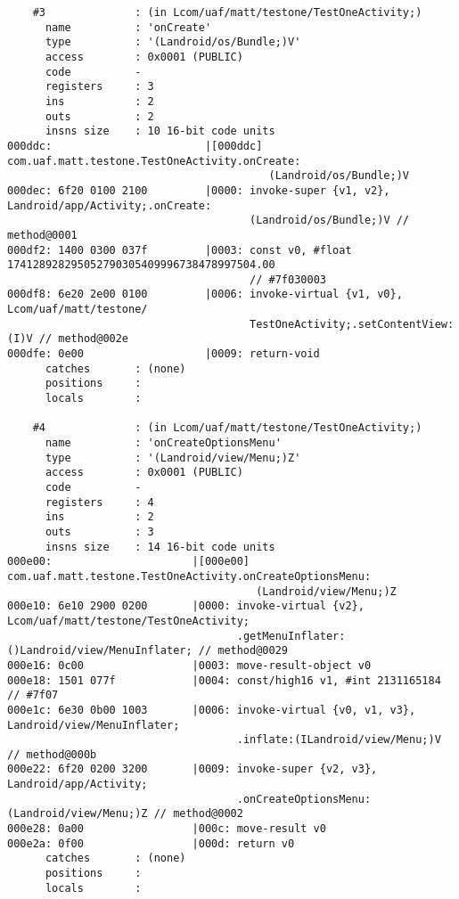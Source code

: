 \begin{lstlisting}
    #3              : (in Lcom/uaf/matt/testone/TestOneActivity;)
      name          : 'onCreate'
      type          : '(Landroid/os/Bundle;)V'
      access        : 0x0001 (PUBLIC)
      code          -
      registers     : 3
      ins           : 2
      outs          : 2
      insns size    : 10 16-bit code units
000ddc:                        |[000ddc] com.uaf.matt.testone.TestOneActivity.onCreate:
                                         (Landroid/os/Bundle;)V
000dec: 6f20 0100 2100         |0000: invoke-super {v1, v2}, Landroid/app/Activity;.onCreate:
                                      (Landroid/os/Bundle;)V // method@0001
000df2: 1400 0300 037f         |0003: const v0, #float 174128928295052790305409996738478997504.00
                                      // #7f030003
000df8: 6e20 2e00 0100         |0006: invoke-virtual {v1, v0}, Lcom/uaf/matt/testone/
                                      TestOneActivity;.setContentView:(I)V // method@002e
000dfe: 0e00                   |0009: return-void
      catches       : (none)
      positions     :
      locals        :

    #4              : (in Lcom/uaf/matt/testone/TestOneActivity;)
      name          : 'onCreateOptionsMenu'
      type          : '(Landroid/view/Menu;)Z'
      access        : 0x0001 (PUBLIC)
      code          -
      registers     : 4
      ins           : 2
      outs          : 3
      insns size    : 14 16-bit code units
000e00:                      |[000e00] com.uaf.matt.testone.TestOneActivity.onCreateOptionsMenu:
                                       (Landroid/view/Menu;)Z
000e10: 6e10 2900 0200       |0000: invoke-virtual {v2}, Lcom/uaf/matt/testone/TestOneActivity;
                                    .getMenuInflater:()Landroid/view/MenuInflater; // method@0029
000e16: 0c00                 |0003: move-result-object v0
000e18: 1501 077f            |0004: const/high16 v1, #int 2131165184 // #7f07
000e1c: 6e30 0b00 1003       |0006: invoke-virtual {v0, v1, v3}, Landroid/view/MenuInflater;
                                    .inflate:(ILandroid/view/Menu;)V // method@000b
000e22: 6f20 0200 3200       |0009: invoke-super {v2, v3}, Landroid/app/Activity;
                                    .onCreateOptionsMenu:(Landroid/view/Menu;)Z // method@0002
000e28: 0a00                 |000c: move-result v0
000e2a: 0f00                 |000d: return v0
      catches       : (none)
      positions     :
      locals        :


\end{lstlisting}
